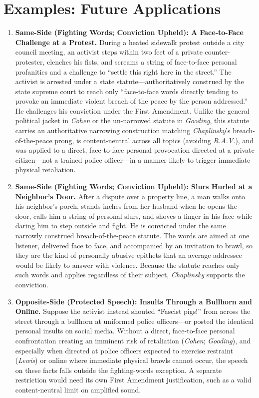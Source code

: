 \documentclass[12pt]{article}
\begin{document}
\section{Examples: Future Applications}
\begin{enumerate}

\item \textbf{Same-Side (Fighting Words; Conviction Upheld): A Face-to-Face Challenge at a Protest.} During a heated sidewalk protest outside a city council meeting, an activist steps within two feet of a private counter-protester, clenches his fists, and screams a string of face-to-face personal profanities and a challenge to ``settle this right here in the street.'' The activist is arrested under a state statute---authoritatively construed by the state supreme court to reach only ``face-to-face words directly tending to provoke an immediate violent breach of the peace by the person addressed.'' He challenges his conviction under the First Amendment. Unlike the general political jacket in \textit{Cohen} or the un-narrowed statute in \textit{Gooding}, this statute carries an authoritative narrowing construction matching \textit{Chaplinsky}'s breach-of-the-peace prong, is content-neutral across all topics (avoiding \textit{R.A.V.}), and was applied to a direct, face-to-face personal provocation directed at a private citizen---not a trained police officer---in a manner likely to trigger immediate physical retaliation.

\item \textbf{Same-Side (Fighting Words; Conviction Upheld): Slurs Hurled at a Neighbor's Door.} After a dispute over a property line, a man walks onto his neighbor's porch, stands inches from her husband when he opens the door, calls him a string of personal slurs, and shoves a finger in his face while daring him to step outside and fight. He is convicted under the same narrowly construed breach-of-the-peace statute. The words are aimed at one listener, delivered face to face, and accompanied by an invitation to brawl, so they are the kind of personally abusive epithets that an average addressee would be likely to answer with violence. Because the statute reaches only such words and applies regardless of their subject, \textit{Chaplinsky} supports the conviction.

\item \textbf{Opposite-Side (Protected Speech): Insults Through a Bullhorn and Online.} Suppose the activist instead shouted ``Fascist pigs!'' from across the street through a bullhorn at uniformed police officers---or posted the identical personal insults on social media. Without a direct, face-to-face personal confrontation creating an imminent risk of retaliation (\textit{Cohen}; \textit{Gooding}), and especially when directed at police officers expected to exercise restraint (\textit{Lewis}) or online where immediate physical brawls cannot occur, the speech on these facts falls outside the fighting-words exception. A separate restriction would need its own First Amendment justification, such as a valid content-neutral limit on amplified sound.


\end{enumerate}
\end{document}
